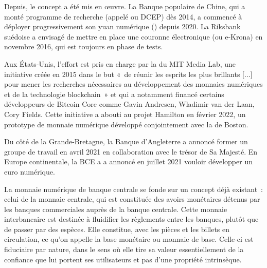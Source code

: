 Depuis, le concept a été mis en œuvre. La Banque populaire de Chine, qui a monté programme de recherche (appelé  ou DCEP) dès 2014, a commencé à déployer progressivement son yuan numérique () depuis 2020. La Riksbank suédoise a envisagé de mettre en place une couronne électronique (ou e-Krona) en novembre 2016, qui est toujours en phase de tests.

Aux États-Unis, l'effort est pris en charge par la  du MIT Media Lab, une initiative créée en 2015 dans le but «~de réunir les esprits les plus brillants [...] pour mener les recherches nécessaires au développement des monnaies numériques et de la technologie blockchain~» et qui a notamment financé certains développeurs de Bitcoin Core comme Gavin Andresen, Wladimir van der Laan, Cory Fields. Cette initiative a abouti au projet Hamilton en février 2022, un prototype de monnaie numérique développé conjointement avec la  de Boston.

Du côté de la Grande-Bretagne, la Banque d'Angleterre a annoncé former un groupe de travail en avril 2021 en collaboration avec le trésor de Sa Majesté. En Europe continentale, la BCE a a annoncé en juillet 2021 vouloir développer un euro numérique.


La monnaie numérique de banque centrale se fonde sur un concept déjà existant~: celui de la monnaie centrale, qui est constituée des avoirs monétaires détenus par les banques commerciales auprès de la banque centrale. Cette monnaie interbancaire est destinée à fluidifier les règlements entre les banques, plutôt que de passer par des espèces. Elle constitue, avec les pièces et les billets en circulation, ce qu'on appelle la base monétaire ou monnaie de base. Celle-ci est fiduciaire par nature, dans le sens où elle tire sa valeur essentiellement de la confiance que lui portent ses utilisateurs et pas d'une propriété intrinsèque.


